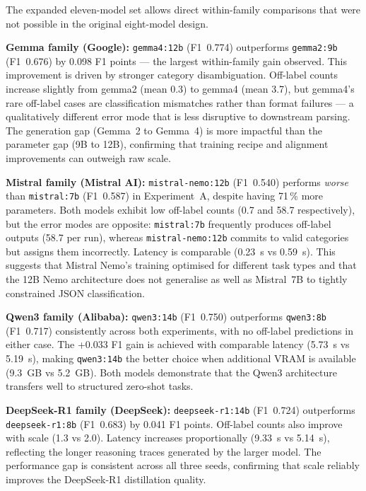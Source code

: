 \documentclass[journal]{IEEEtran}
\begin{document}
The expanded eleven-model set allows direct within-family comparisons
that were not possible in the original eight-model design.

\textbf{Gemma family (Google):} \texttt{gemma4:12b} (F1~0.774)
outperforms \texttt{gemma2:9b} (F1~0.676) by 0.098 F1 points —
the largest within-family gain observed. This improvement is driven by stronger category disambiguation.
Off-label counts increase slightly from gemma2 (mean 0.3) to
gemma4 (mean 3.7), but gemma4's rare off-label cases are
classification mismatches rather than format failures —
a qualitatively different error mode that is less disruptive
to downstream parsing. The generation gap (Gemma~2 to
Gemma~4) is more impactful than the parameter gap (9B to 12B),
confirming that training recipe and alignment improvements can
outweigh raw scale.

\textbf{Mistral family (Mistral AI):} \texttt{mistral-nemo:12b}
(F1~0.540) performs \emph{worse} than \texttt{mistral:7b} (F1~0.587)
in Experiment~A, despite having 71\,\% more parameters. Both models
exhibit low off-label counts (0.7 and 58.7 respectively), but the
error modes are opposite: \texttt{mistral:7b} frequently produces
off-label outputs (58.7 per run), whereas \texttt{mistral-nemo:12b}
commits to valid categories but assigns them incorrectly.
Latency is comparable (0.23~s vs 0.59~s). This suggests that Mistral
Nemo's training optimised for different task types and that the
12B Nemo architecture does not generalise as well as Mistral~7B to
tightly constrained JSON classification.

\textbf{Qwen3 family (Alibaba):} \texttt{qwen3:14b} (F1~0.750)
outperforms \texttt{qwen3:8b} (F1~0.717) consistently across both
experiments, with no off-label predictions in either case. The
+0.033 F1 gain is achieved with comparable latency (5.73~s vs 5.19~s),
making \texttt{qwen3:14b} the better choice when additional VRAM is
available (9.3~GB vs 5.2~GB). Both models demonstrate that the Qwen3
architecture transfers well to structured zero-shot tasks.

\textbf{DeepSeek-R1 family (DeepSeek):} \texttt{deepseek-r1:14b}
(F1~0.724) outperforms \texttt{deepseek-r1:8b} (F1~0.683) by 0.041
F1 points. Off-label counts also improve with scale (1.3 vs 2.0).
Latency increases proportionally (9.33~s vs 5.14~s), reflecting
the longer reasoning traces generated by the larger model. The
performance gap is consistent across all three seeds, confirming
that scale reliably improves the DeepSeek-R1 distillation quality.
\end{document}
